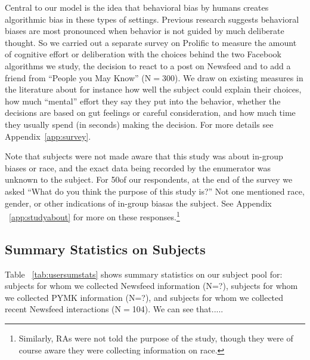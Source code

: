 \documentclass[12pt,letterpaper]{article}
\newcommand{\ProlificSampleSize}{300}
\newcommand{\RecentInteractionsSampleSize}{104}
\newcommand{\StudyAboutSampleSize}{50}
\begin{document}
Central to our model is the idea that behavioral bias by humans creates algorithmic bias in these types of settings. Previous research suggests behavioral biases are most pronounced when behavior is not guided by much deliberate thought. So we carried out a separate survey on Prolific to measure the amount of cognitive effort or deliberation with the choices behind the two Facebook algorithms we study, the decision to react to a post on Newsfeed and to add a friend from ``People you May Know'' (N$=$\ProlificSampleSize). We draw on existing measures in the literature about for instance how well the subject could explain their choices, how much ``mental'' effort they say they put into the behavior, whether the decisions are based on gut feelings or careful consideration, and how much time they usually spend (in seconds) making the decision. For more details see Appendix~\ref{app:survey}.

Note that subjects were not made aware that this study was about in-group biases or race, and the exact data being recorded by the enumerator was unknown to the subject. For \StudyAboutSampleSize of our respondents, at the end of the survey we asked ``What do you think the purpose of this study is?'' Not one mentioned race, gender, or other indications of in-group biasas the subject. See Appendix ~\ref{app:studyabout} for more on these responses.\footnote{Similarly, RAs were not told the purpose of the study, though they were of course aware they were collecting information on race.}

\subsection{Summary Statistics on Subjects}

Table ~\ref{tab:usersumstats} shows summary statistics on our subject pool for: subjects for whom we collected Newsfeed information (N=?), subjects for whom we collected PYMK information (N=?), and subjects for whom we collected recent Newsfeed interactions (N$=$\RecentInteractionsSampleSize).  We can see that.....

    
\end{document}
